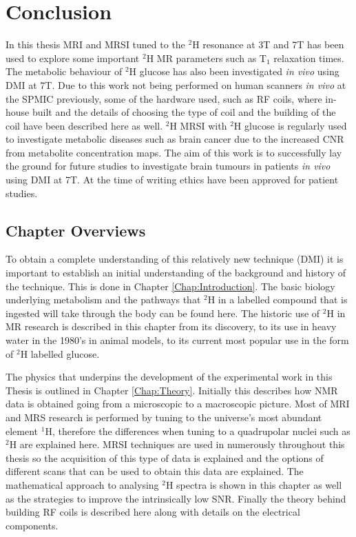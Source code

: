 \chapter{Conclusion}
\label{section:Conclusion}

In this thesis \ac{MRI} and \ac{MRSI} tuned to the $^2$H resonance at 3T and 7T has been used to explore some important $^2$H MR parameters such as T$_1$ relaxation times. The metabolic behaviour of $^2$H glucose has also been investigated \textit{in vivo} using \ac{DMI} at 7T. Due to this work not being performed on human scanners \textit{in vivo} at the \ac{SPMIC} previously, some of the hardware used, such as \ac{RF} coils, where in-house built and the details of choosing the type of coil and the building of the coil have been described here as well. $^2$H MRSI with $^2$H glucose is regularly used to investigate metabolic diseases such as brain cancer due to the increased \ac{CNR} from metabolite concentration maps. The aim of this work is to successfully lay the ground for future studies to investigate brain tumours in patients \textit{in vivo} using \ac{DMI} at 7T. At the time of writing ethics have been approved for patient studies. 

\section{Chapter Overviews}

To obtain a complete understanding of this relatively new technique (\ac{DMI}) it is important to establish an initial understanding of the background and history of the technique. This is done in Chapter \ref{Chap:Introduction}. The basic biology underlying metabolism and the pathways that $^2$H in a labelled compound that is ingested will take through the body can be found here. The historic use of $^2$H in MR research is described in this chapter from its discovery, to its use in heavy water in the 1980's in animal models, to its current most popular use in the form of $^2$H labelled glucose.

The physics that underpins the development of the experimental work in this Thesis is outlined in Chapter \ref{Chap:Theory}. Initially this describes how \ac{NMR} data is obtained going from a microscopic to a macroscopic picture. Most of \ac{MRI} and \ac{MRS} research is performed by tuning to the universe's most abundant element $^1$H, therefore the differences when tuning to a quadrupolar nuclei such as $^2$H are explained here. \Ac{MRSI} techniques are used in numerously throughout this thesis so the acquisition of this type of data is explained and the options of different scans that can be used to obtain this data are explained. The mathematical approach to analysing $^2$H spectra is shown in this chapter as well as the strategies to improve the intrinsically low \ac{SNR}. Finally the theory behind building \ac{RF} coils is described here along with details on the electrical components.

